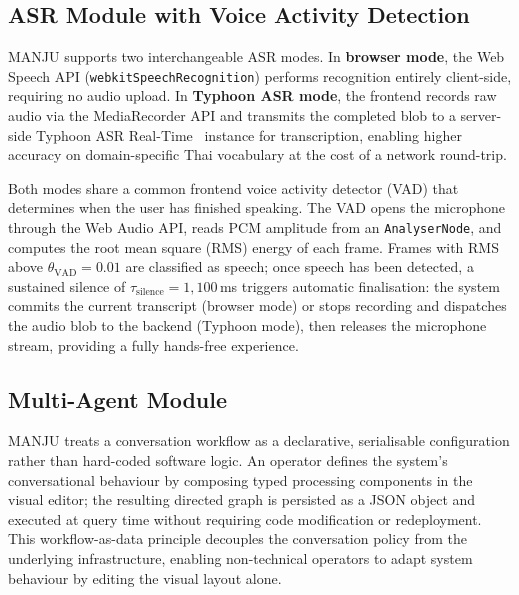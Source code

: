 \documentclass[10pt, a4paper, twocolumn]{article}
\begin{document}
\subsection{ASR Module with Voice Activity Detection}

MANJU supports two interchangeable ASR modes.
In \textbf{browser mode}, the Web Speech API
(\texttt{webkitSpeechRecognition}) performs recognition entirely
client-side, requiring no audio upload.
In \textbf{Typhoon ASR mode}, the frontend records raw audio via the
MediaRecorder API and transmits the completed blob to a server-side
Typhoon ASR Real-Time~\cite{sirichotedumrong2026typhoonasr} instance
for transcription, enabling higher accuracy on domain-specific Thai
vocabulary at the cost of a network round-trip.

Both modes share a common frontend voice activity detector (VAD)
that determines when the user has finished speaking.
The VAD opens the microphone through the Web Audio API, reads PCM
amplitude from an \texttt{AnalyserNode}, and computes the root mean
square (RMS) energy of each frame.
Frames with RMS above $\theta_\text{VAD} = 0.01$ are classified as
speech; once speech has been detected, a sustained silence of
$\tau_\text{silence} = 1{,}100$\,ms triggers automatic finalisation:
the system commits the current transcript (browser mode) or stops
recording and dispatches the audio blob to the backend (Typhoon mode),
then releases the microphone stream, providing a fully hands-free
experience.

\subsection{Multi-Agent Module}

MANJU treats a conversation workflow as a declarative, serialisable
configuration rather than hard-coded software logic.
An operator defines the system's conversational behaviour by composing
typed processing components in the visual editor; the resulting directed
graph is persisted as a JSON object and executed at query time without
requiring code modification or redeployment.
This workflow-as-data principle decouples the conversation policy from
the underlying infrastructure, enabling non-technical operators to adapt
system behaviour by editing the visual layout alone.
\end{document}
